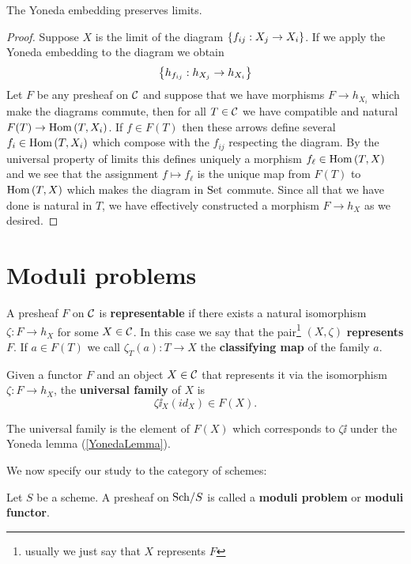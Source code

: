 \begin{lemma}\label{YonedaEmbeddingPreservesLimits}
The Yoneda embedding preserves limits.
\end{lemma}
\begin{proof}
Suppose $X$ is the limit of the diagram $\left\{{f_{ij}:X_j\to X_i}\right\}$. If we apply the Yoneda embedding to the diagram we obtain
\[\left\{{h_{f_{ij}}:h_{X_j}\to h_{X_i}}\right\}\]
Let $F$ be any presheaf on $\mathcal{C}$ and suppose that we have morphisms $F\to h_{X_i}$ which make the diagrams commute, then for all $T\in \mathcal{C}$ we have compatible and natural $F(T)\to \mathrm{Hom}\,(T,X_i)$. 
If $f\in F(T)$ then these arrows define several $f_i\in \mathrm{Hom}\,(T,X_i)$ which compose with the $f_{ij}$ respecting the diagram. 
By the universal property of limits this defines uniquely a morphism $f_\ell\in \mathrm{Hom}\,(T,X)$ and we see that the assignment $f\mapsto f_\ell$ is the unique map from $F(T)$ to $\mathrm{Hom}\,(T,X)$ which makes the diagram in $\mathrm{Set}$ commute. 
Since all that we have done is natural in $T$, we have effectively constructed a morphism $F\to h_X$ as we desired.
\end{proof}



\section{Moduli problems}

\begin{definition}
A presheaf $F$ on $\mathcal{C}$ is \textbf{representable} if there exists a natural isomorphism $\zeta:F\to h_X$ for some $X\in \mathcal{C}$. 
In this case we say that the pair\footnote{usually we just say that $X$ represents $F$} $(X,\zeta)$ \textbf{represents} $F$.
If $a\in F(T)$ we call $\zeta_T(a):T\to X$ the \textbf{classifying map} of the family $a$.
\end{definition}
\begin{definition}
Given a functor $F$ and an object $X\in \mathcal{C}$ that represents it via the isomorphism $\zeta:F\to h_X$, the \textbf{universal family} of $X$ is
\[\zeta\ii_X(id_X)\in F(X).\]
\end{definition}
\begin{remark}
The universal family is the element of $F(X)$ which corresponds to $\zeta\ii$ under the Yoneda lemma (\ref{YonedaLemma}).
\end{remark}

We now specify our study to the category of schemes:

\begin{definition}
Let $S$ be a scheme. A presheaf on ${\mathrm{Sch}}/{S}$ is called a \textbf{moduli problem} or \textbf{moduli functor}.
\end{definition}

